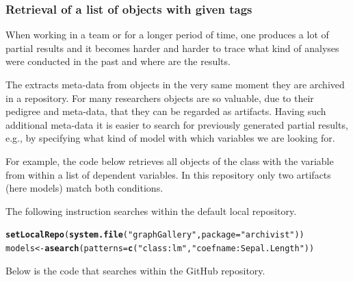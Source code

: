 \documentclass[nojss]{jss}\usepackage[]{graphicx}\usepackage[]{color}
\makeatletter
\newcommand{\hlstr}[1]{\textcolor[rgb]{0.192,0.494,0.8}{#1}}%
\newcommand{\hlstd}[1]{\textcolor[rgb]{0.345,0.345,0.345}{#1}}%
\newcommand{\hlkwb}[1]{\textcolor[rgb]{0.69,0.353,0.396}{#1}}%
\newcommand{\hlkwc}[1]{\textcolor[rgb]{0.333,0.667,0.333}{#1}}%
\newcommand{\hlkwd}[1]{\textcolor[rgb]{0.737,0.353,0.396}{\textbf{#1}}}%
\newenvironment{kframe}{%
 \def\at@end@of@kframe{}%
 \ifinner\ifhmode%
  \def\at@end@of@kframe{\end{minipage}}%
  \begin{minipage}{\columnwidth}%
 \fi\fi%
 \def\FrameCommand##1{\hskip\@totalleftmargin \hskip-\fboxsep
 \colorbox{shadecolor}{##1}\hskip-\fboxsep
     \hskip-\linewidth \hskip-\@totalleftmargin \hskip\columnwidth}%
 \MakeFramed {\advance\hsize-\width
   \@totalleftmargin\z@ \linewidth\hsize
   \@setminipage}}%
 {\par\unskip\endMakeFramed%
 \at@end@of@kframe}
\newenvironment{knitrout}{}{} %
\makeatother
\begin{document}


\subsubsection[Retrieval of a list of R objects with given tags]{Retrieval of a list of  objects with given tags}

When working in a team or for a longer period of time, one produces a lot of partial results and it becomes harder and harder to trace what kind of analyses were conducted in the past and where are the results. 

The  extracts meta-data from  objects in the very same moment they are archived in a repository. For many researchers objects are so valuable, due to their pedigree and meta-data, that they can be regarded as artifacts. Having such additional meta-data it is easier to search for previously generated partial results, e.g., by specifying what kind of model with which variables we are looking for.

For example, the code below retrieves all objects of the  class with the  variable from within a list of dependent variables. In this repository only two artifacts (here  models) match both conditions.

The following instruction searches within the default local repository.

\begin{knitrout}
\color{fgcolor}\begin{kframe}
\begin{alltt}
\hlkwd{setLocalRepo}\hlstd{(}\hlkwd{system.file}\hlstd{(}\hlstr{"graphGallery"}\hlstd{,} \hlkwc{package} \hlstd{=} \hlstr{"archivist"}\hlstd{))}
\hlstd{models} \hlkwb{<-} \hlkwd{asearch}\hlstd{(}\hlkwc{patterns} \hlstd{=} \hlkwd{c}\hlstd{(}\hlstr{"class:lm"}\hlstd{,} \hlstr{"coefname:Sepal.Length"}\hlstd{))}
\end{alltt}
\end{kframe}
\end{knitrout}

Below is the code that searches within the GitHub repository.
\end{document}

